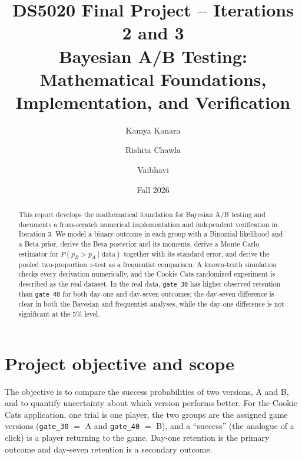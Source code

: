 \documentclass[11pt]{article}
\title{DS5020 Final Project -- Iterations 2 and 3\\[3pt]\large Bayesian A/B Testing: Mathematical Foundations, Implementation, and Verification}
\author{Kamya Kanara \and Rishita Chawla \and Vaibhavi}
\date{Fall 2026}
\begin{document}
\maketitle
\begin{abstract}
This report develops the mathematical foundation for Bayesian A/B testing and documents a from-scratch numerical implementation and independent verification in Iteration 3. We model a binary outcome in each group with a Binomial likelihood and a Beta prior, derive the Beta posterior and its moments, derive a Monte Carlo estimator for $P(p_B>p_A\mid\text{data})$ together with its standard error, and derive the pooled two-proportion $z$-test as a frequentist comparison. A known-truth simulation checks every derivation numerically, and the Cookie Cats randomized experiment is described as the real dataset. In the real data, \texttt{gate\_30} has higher observed retention than \texttt{gate\_40} for both day-one and day-seven outcomes; the day-seven difference is clear in both the Bayesian and frequentist analyses, while the day-one difference is not significant at the 5\% level.
\end{abstract}

\section{Project objective and scope}
The objective is to compare the success probabilities of two versions, A and B, and to quantify uncertainty about which version performs better. For the Cookie Cats application, one trial is one player, the two groups are the assigned game versions (\texttt{gate\_30} $=$ A and \texttt{gate\_40} $=$ B), and a ``success'' (the analogue of a click) is a player returning to the game. Day-one retention is the primary outcome and day-seven retention is a secondary outcome.
\end{document}
